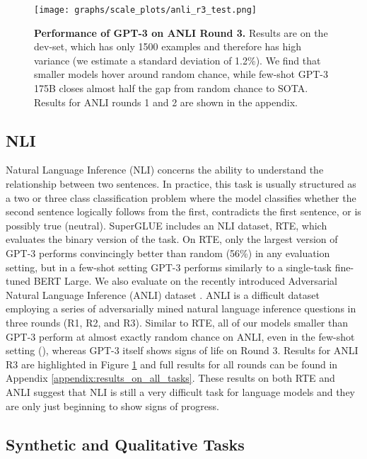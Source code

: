 \documentclass{article}
\begin{document}
    \begin{figure}
\centering\texttt{[image: graphs/scale\_plots/anli\_r3\_test.png]}
\caption{\textbf{Performance of GPT-3 on ANLI Round 3.} Results are on the dev-set, which has only 1500 examples and therefore has high variance (we estimate a standard deviation of 1.2\%). We find that smaller models hover around random chance, while few-shot GPT-3 175B closes almost half the gap from random chance to SOTA. Results for ANLI rounds 1 and 2 are shown in the appendix.}
\label{graph:anli}
\end{figure}     \subsection{NLI}
    \label{section:ANLI}
    Natural Language Inference (NLI) \cite{fyodorov2000natural} concerns the ability to understand the relationship between two sentences. In practice, this task is usually structured as a two or three class classification problem where the model classifies whether the second sentence logically follows from the first, contradicts the first sentence, or is possibly true (neutral). SuperGLUE includes an NLI dataset, RTE, which evaluates the binary version of the task. On RTE, only the largest version of GPT-3 performs convincingly better than random (56\%) in any evaluation setting, but in a few-shot setting GPT-3 performs similarly to a single-task fine-tuned BERT Large. We also evaluate on the recently introduced Adversarial Natural Language Inference (ANLI) dataset \cite{nie2019adversarial}. ANLI is a difficult dataset employing a series of adversarially mined natural language inference questions in three rounds (R1, R2, and R3). Similar to RTE, all of our models smaller than GPT-3 perform at almost exactly random chance on ANLI, even in the few-shot setting (), whereas GPT-3 itself shows signs of life on Round 3. Results for ANLI R3 are highlighted in Figure \ref{graph:anli} and full results for all rounds can be found in Appendix \ref{appendix:results_on_all_tasks}. These results on both RTE and ANLI suggest that NLI is still a very difficult task for language models and they are only just beginning to show signs of progress. 
    \subsection{Synthetic and Qualitative Tasks}
    \label{section:Synthetic_and_Qualitative_Tasks}
    
\end{document}
